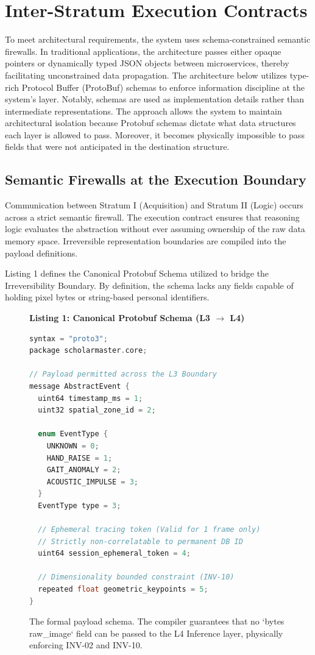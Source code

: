 \documentclass[conference]{IEEEtran}
\begin{document}
\section{Inter-Stratum Execution Contracts}
To meet architectural requirements, the system uses schema-constrained semantic firewalls. In traditional applications, the architecture passes either opaque pointers or dynamically typed JSON objects between microservices, thereby facilitating unconstrained data propagation. The architecture below utilizes type-rich Protocol Buffer (ProtoBuf) schemas to enforce information discipline at the system's layer. Notably, schemas are used as implementation details rather than intermediate representations. The approach allows the system to maintain architectural isolation because Protobuf schemas dictate what data structures each layer is allowed to pass. Moreover, it becomes physically impossible to pass fields that were not anticipated in the destination structure.

\subsection{Semantic Firewalls at the Execution Boundary}
Communication between Stratum I (Acquisition) and Stratum II (Logic) occurs across a strict semantic firewall. The execution contract ensures that reasoning logic evaluates the abstraction without ever assuming ownership of the raw data memory space. Irreversible representation boundaries are compiled into the payload definitions.

Listing 1 defines the Canonical Protobuf Schema utilized to bridge the Irreversibility Boundary. By definition, the schema lacks any fields capable of holding pixel bytes or string-based personal identifiers. 

\begin{figure}[htbp]
\textbf{Listing 1: Canonical Protobuf Schema (L3 $\to$ L4)}
\begin{lstlisting}[language=C++]
syntax = "proto3";
package scholarmaster.core;

// Payload permitted across the L3 Boundary
message AbstractEvent {
  uint64 timestamp_ms = 1;
  uint32 spatial_zone_id = 2;
  
  enum EventType {
    UNKNOWN = 0;
    HAND_RAISE = 1;
    GAIT_ANOMALY = 2;
    ACOUSTIC_IMPULSE = 3;
  }
  EventType type = 3;
  
  // Ephemeral tracing token (Valid for 1 frame only)
  // Strictly non-correlatable to permanent DB ID
  uint64 session_ephemeral_token = 4;
  
  // Dimensionality bounded constraint (INV-10)
  repeated float geometric_keypoints = 5; 
}
\end{lstlisting}
\caption{The formal payload schema. The compiler guarantees that no `bytes raw\_image` field can be passed to the L4 Inference layer, physically enforcing INV-02 and INV-10.}
\label{fig:protobuf}
\end{figure}
\end{document}
